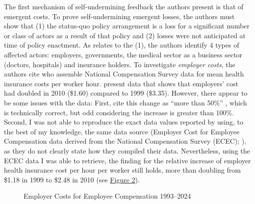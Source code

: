 \documentclass[11pt]{article}
\begin{document}
The first mechanism of self-undermining feedback the authors present is that of emergent costs. To prove self-undermining emergent losses, the authors must show that (1) the status-quo policy arrangement is a loss for a significant number or class of actors as a result of that policy and (2) losses were not anticipated at time of policy enactment. As relates to the (1), the authors identify 4 types of affected actors: employers, governments, the medical sector as a business sector (doctors, hospitals) and insurance holders. To investigate \textit{employer costs}, the authors cite \textcite[][]{Claxton2011} who assemble National Compensation Survey data for mean health insurance costs per worker hour. \textcite[][]{Claxton2011} present data that shows that employers' cost had doubled in 2010 (\$1.60) compared to 1999 (\$3.35). However, there appear to be some issues with the data: First, \textcite[][]{Jacobs2014} cite this change as \enquote{more than 50\%} , which is technically correct, but odd considering the increase is greater than 100\%. Second, I was not able to reproduce the exact data values reported by \textcite[][]{Claxton2011} using, to the best of my knowledge, the same data source (Employer Cost for Employee Compensation data derived from the National Compensation Survey (ECEC); ), as they do not clearly state how they compiled their data. Nevertheless, using the ECEC data I was able to retrieve, the finding for the relative increase of employer health insurance cost per hour per worker still holds, more than doubling from \$1.18 in 1999 to \$2.48 in 2010 (see \hyperref[fig:ecec]{Figure 2}).

\begin{figure}[H]
  \sffamily
  \caption{Employer Costs for Employee Compensation 1993--2024}
  
  \label{fig:ecec}
\end{figure}
\end{document}
